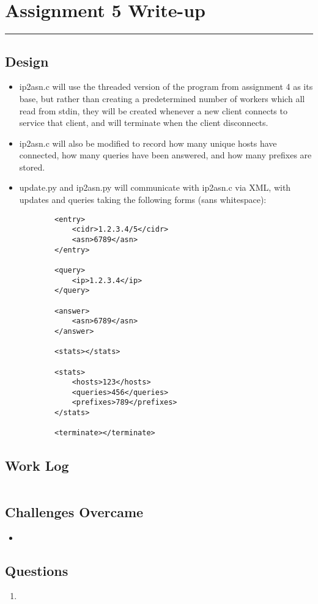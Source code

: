 \documentclass[letterpaper,10pt,fleqn]{article}
\numberwithin{equation}{section}
\begin{document}

\section*{Assignment 5 Write-up}
\hrule

\subsection*{Design}
\begin{itemize}
    \item ip2asn.c will use the threaded version of the program from assignment 4 as its base, but rather than creating a predetermined number of workers which all read from stdin, they will be created whenever a new client connects to service that client, and will terminate when the client disconnects.
    \item ip2asn.c will also be modified to record how many unique hosts have connected, how many queries have been answered, and how many prefixes are stored.
    \item update.py and ip2asn.py will communicate with ip2asn.c via XML, with updates and queries taking the following forms (sans whitespace):
    \begin{verbatim}
        <entry>
            <cidr>1.2.3.4/5</cidr>
            <asn>6789</asn>
        </entry>

        <query>
            <ip>1.2.3.4</ip>
        </query>

        <answer>
            <asn>6789</asn>
        </answer>

        <stats></stats>

        <stats>
            <hosts>123</hosts>
            <queries>456</queries>
            <prefixes>789</prefixes>
        </stats>

        <terminate></terminate>
    \end{verbatim}
\end{itemize}

\subsection*{Work Log}
\begin{verbatim}
\end{verbatim}
\subsection*{Challenges Overcame}
\begin{itemize}
    \item
\end{itemize}

\subsection*{Questions}
\begin{enumerate}
    \item
\end{enumerate}
\end{document}
